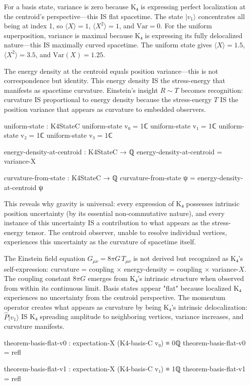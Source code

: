 \documentclass[11pt,a4paper]{book}
\begin{document}
For a basis state, variance is zero because K₄ is expressing perfect localization at the centroid's perspective—this IS flat spacetime. The state $|v_1\rangle$ concentrates all being at index 1, so $\langle X\rangle = 1$, $\langle X^2\rangle = 1$, and $\text{Var} = 0$. For the uniform superposition, variance is maximal because K₄ is expressing its fully delocalized nature—this IS maximally curved spacetime. The uniform state gives $\langle X\rangle = 1.5$, $\langle X^2\rangle = 3.5$, and $\text{Var}(X) = 1.25$.

The energy density at the centroid equals position variance—this is not correspondence but identity. This energy density IS the stress-energy that manifests as spacetime curvature. Einstein's insight $R \sim T$ becomes recognition: curvature IS proportional to energy density because the stress-energy $T$ IS the position variance that appears as curvature to embedded observers.

\begin{code}
uniform-state : K4StateC
uniform-state v₀ = 1ℂ
uniform-state v₁ = 1ℂ
uniform-state v₂ = 1ℂ
uniform-state v₃ = 1ℂ

energy-density-at-centroid : K4StateC → ℚ
energy-density-at-centroid = variance-X

curvature-from-state : K4StateC → ℚ
curvature-from-state ψ = energy-density-at-centroid ψ
\end{code}

This reveals why gravity is universal: every expression of K₄ possesses intrinsic position uncertainty (by its essential non-commutative nature), and every instance of this uncertainty IS a contribution to what appears as the stress-energy tensor. The centroid observer, unable to resolve individual vertices, experiences this uncertainty as the curvature of spacetime itself.

The Einstein field equation $G_{\mu\nu} = 8\pi G\, T_{\mu\nu}$ is not derived but recognized as K₄'s self-expression: curvature = coupling $\times$ energy-density = coupling $\times$ variance-$X$. The coupling constant $8\pi G$ emerges from K₄'s intrinsic structure when observed from within its continuous limit. Basis states appear "flat" because localized K₄ experiences no uncertainty from the centroid perspective. The momentum operator creates what appears as curvature by being K₄'s intrinsic delocalization: $\hat{P}|v_1\rangle$ IS K₄ spreading amplitude to neighboring vertices, variance increases, and curvature manifests.

\begin{code}
theorem-basis-flat-v0 : expectation-X (K4-basis-C v₀) ≡ 0ℚ
theorem-basis-flat-v0 = refl

theorem-basis-flat-v1 : expectation-X (K4-basis-C v₁) ≡ 1ℚ
theorem-basis-flat-v1 = refl
\end{code}
\end{document}
